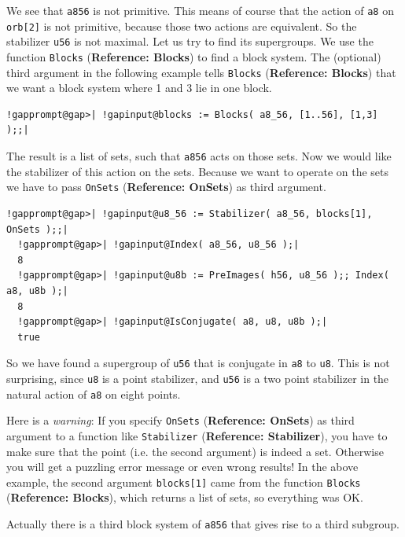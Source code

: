\documentclass[a4paper,11pt]{report}
\begin{document}
{{ We see that \texttt{a8{\textunderscore}56} is not primitive. This means of course that the action of \texttt{a8} on \texttt{orb[2]} is not primitive, because those two actions are equivalent. So the stabilizer \texttt{u56} is not maximal. Let us try to find its supergroups. We use the function \texttt{Blocks} (\textbf{Reference: Blocks}) to find a block system. The (optional) third argument in the following example
tells \texttt{Blocks} (\textbf{Reference: Blocks}) that we want a block system where 1 and 3 lie in one block. 

 
\begin{Verbatim}[commandchars=!@|,fontsize=\small,frame=single,label=Example]
  !gapprompt@gap>| !gapinput@blocks := Blocks( a8_56, [1..56], [1,3] );;|
\end{Verbatim}
 

 The result is a list of sets, such that \texttt{a8{\textunderscore}56} acts on those sets. Now we would like the stabilizer of this action on the
sets. Because we want to operate on the sets we have to pass \texttt{OnSets} (\textbf{Reference: OnSets}) as third argument. 

 
\begin{Verbatim}[commandchars=!@|,fontsize=\small,frame=single,label=Example]
  !gapprompt@gap>| !gapinput@u8_56 := Stabilizer( a8_56, blocks[1], OnSets );;|
  !gapprompt@gap>| !gapinput@Index( a8_56, u8_56 );|
  8
  !gapprompt@gap>| !gapinput@u8b := PreImages( h56, u8_56 );; Index( a8, u8b );|
  8
  !gapprompt@gap>| !gapinput@IsConjugate( a8, u8, u8b );|
  true
\end{Verbatim}
 

 So we have found a supergroup of \texttt{u56} that is conjugate in \texttt{a8} to \texttt{u8}. This is not surprising, since \texttt{u8} is a point stabilizer, and \texttt{u56} is a two point stabilizer in the natural action of \texttt{a8} on eight points. 

 Here is a \emph{warning}: If you specify \texttt{OnSets} (\textbf{Reference: OnSets}) as third argument to a function like \texttt{Stabilizer} (\textbf{Reference: Stabilizer}), you have to make sure that the point (i.e. the second argument) is indeed a
set. Otherwise you will get a puzzling error message or even wrong results! In
the above example, the second argument \texttt{blocks[1]} came from the function \texttt{Blocks} (\textbf{Reference: Blocks}), which returns a list of sets, so everything was OK. 

 Actually there is a third block system of \texttt{a8{\textunderscore}56} that gives rise to a third subgroup. 

}}
\end{document}
